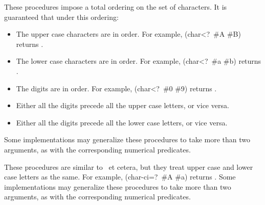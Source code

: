 \begin{entry}{%
}

\label{characterequality}
These procedures impose a total ordering on the set of characters.  It
is guaranteed that under this ordering:

\begin{itemize}
\item The upper case characters are in order.  For example, {\cf 
   (char<?\ \#\backwhack{}A \#\backwhack{}B)} returns \schtrue.
\item The lower case characters are in order.  For example, {\cf 
   (char<?\ \#\backwhack{}a \#\backwhack{}b)} returns \schtrue.
\item The digits are in order.  For example, {\cf 
   (char<?\ \#\backwhack{}0 \#\backwhack{}9)} returns \schtrue.
\item Either all the digits precede all the upper case letters, or vice versa.
\item Either all the digits precede all the lower case letters, or vice versa.
\end{itemize}

Some implementations may generalize these procedures to take more than
two arguments, as with the corresponding numerical predicates.

\end{entry}


\begin{entry}{%
}

These procedures are similar to \ et cetera, but they treat
upper case and lower case letters as the same.  For example, {\cf
(char-ci=?\ \#\backwhack{}A \#\backwhack{}a)} returns \schtrue.  Some
implementations may generalize these procedures to take more than two
arguments, as with the corresponding numerical predicates.

\end{entry}


